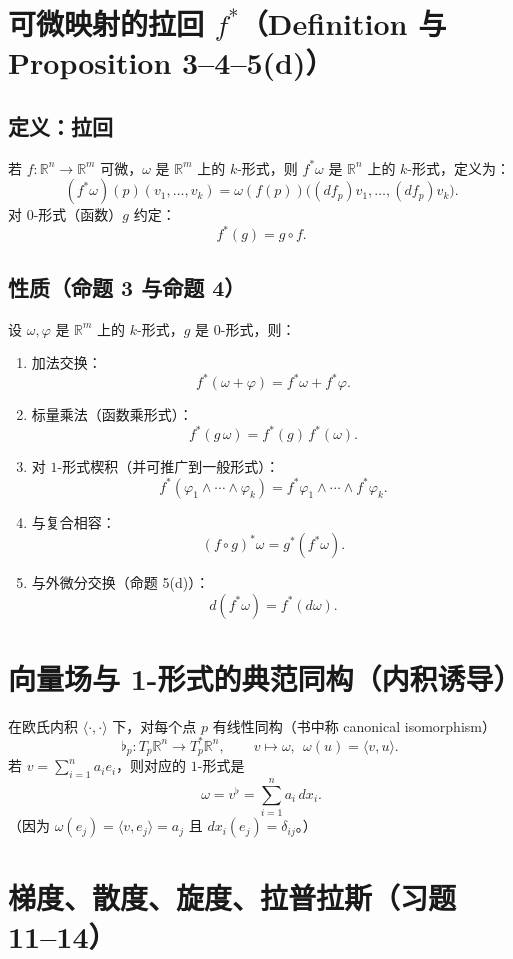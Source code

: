 \documentclass[11pt,a4paper]{article}
\newcommand{\R}{\mathbb{R}}
\newcommand{\ip}[2]{\langle #1,#2\rangle}
\begin{document}
\section{可微映射的拉回 \texorpdfstring{$f^\ast$}{f*}（Definition 与 Proposition 3--4--5(d)）}

\subsection{定义：拉回}
若 $f:\R^n\to\R^m$ 可微，$\omega$ 是 $\R^m$ 上的 $k$-形式，则 $f^\ast\omega$ 是 $\R^n$ 上的 $k$-形式，定义为：
\[
\boxed{\ (f^\ast\omega)(p)(v_1,\dots,v_k)=\omega(f(p))\bigl((df_p)v_1,\dots,(df_p)v_k\bigr). }
\]
对 $0$-形式（函数）$g$ 约定：
\[
\boxed{\ f^\ast(g)=g\circ f. }
\]

\subsection{性质（命题 3 与命题 4）}
设 $\omega,\varphi$ 是 $\R^m$ 上的 $k$-形式，$g$ 是 $0$-形式，则：
\begin{enumerate}[label=(\alph*)]
  \item 加法交换：
  \[
  \boxed{\ f^\ast(\omega+\varphi)=f^\ast\omega+f^\ast\varphi. }
  \]
  \item 标量乘法（函数乘形式）：
  \[
  \boxed{\ f^\ast(g\,\omega)=f^\ast(g)\,f^\ast(\omega). }
  \]
  \item 对 $1$-形式楔积（并可推广到一般形式）：
  \[
  \boxed{\ f^\ast(\varphi_1\wedge\cdots\wedge\varphi_k)=f^\ast\varphi_1\wedge\cdots\wedge f^\ast\varphi_k. }
  \]
  \item 与复合相容：
  \[
  \boxed{\ (f\circ g)^\ast\omega=g^\ast(f^\ast\omega). }
  \]
  \item 与外微分交换（命题 5(d)）：
  \[
  \boxed{\ d(f^\ast\omega)=f^\ast(d\omega). }
  \]
\end{enumerate}

\section{向量场与 1-形式的典范同构（内积诱导）}
在欧氏内积 $\ip{\cdot}{\cdot}$ 下，对每个点 $p$ 有线性同构（书中称 canonical isomorphism）
\[
\flat_p:T_p\R^n\to T_p^\ast\R^n,\qquad v\mapsto \omega,\ \ \omega(u)=\ip{v}{u}.
\]
若 $v=\sum_{i=1}^n a_i e_i$，则对应的 $1$-形式是
\[
\boxed{\ \omega = v^\flat = \sum_{i=1}^n a_i\,dx_i. }
\]
（因为 $\omega(e_j)=\ip{v}{e_j}=a_j$ 且 $dx_i(e_j)=\delta_{ij}$。）

\section{梯度、散度、旋度、拉普拉斯（习题 11--14）}
\end{document}
